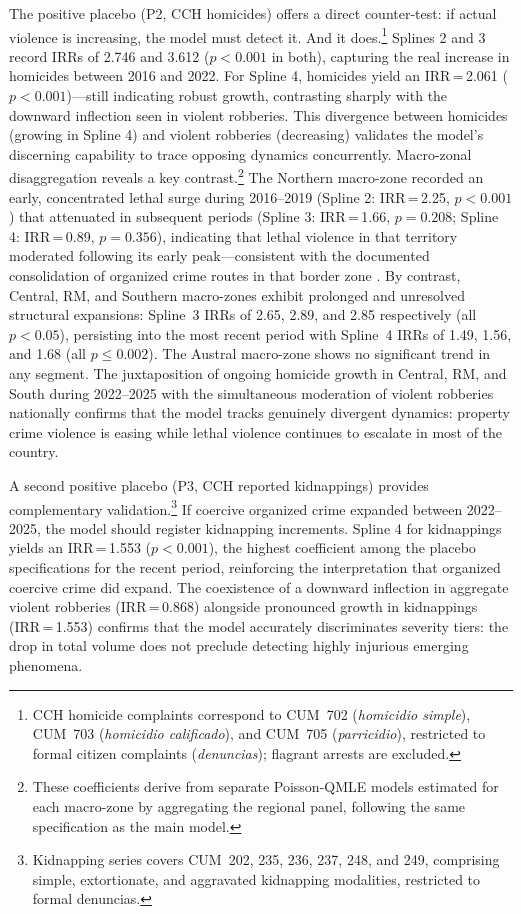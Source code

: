 \documentclass[pdflatex,sn-basic]{sn-jnl}
\begin{document}
The positive placebo (P2, CCH homicides) offers a direct counter-test: if actual violence is increasing, the model must detect it. And it does.\footnote{CCH homicide complaints correspond to CUM~702 (\textit{homicidio simple}), CUM~703 (\textit{homicidio calificado}), and CUM~705 (\textit{parricidio}), restricted to formal citizen complaints (\textit{denuncias}); flagrant arrests are excluded.} Splines 2 and 3 record IRRs of 2.746 and 3.612 ($p<0.001$ in both), capturing the real increase in homicides between 2016 and 2022. For Spline 4, homicides yield an IRR\,=\,2.061 ($p<0.001$)---still indicating robust growth, contrasting sharply with the downward inflection seen in violent robberies. This divergence between homicides (growing in Spline 4) and violent robberies (decreasing) validates the model's discerning capability to trace opposing dynamics concurrently. Macro-zonal disaggregation reveals a key contrast.\footnote{These coefficients derive from separate Poisson-QMLE models estimated for each macro-zone by aggregating the regional panel, following the same specification as the main model.} The Northern macro-zone recorded an early, concentrated lethal surge during 2016--2019 (Spline 2: IRR\,=\,2.25, $p<0.001$) that attenuated in subsequent periods (Spline 3: IRR\,=\,1.66, $p=0.208$; Spline 4: IRR\,=\,0.89, $p=0.356$), indicating that lethal violence in that territory moderated following its early peak---consistent with the documented consolidation of organized crime routes in that border zone \citep{bravo2024}. By contrast, Central, RM, and Southern macro-zones exhibit prolonged and unresolved structural expansions: Spline~3 IRRs of 2.65, 2.89, and 2.85 respectively (all $p<0.05$), persisting into the most recent period with Spline~4 IRRs of 1.49, 1.56, and 1.68 (all $p\leq0.002$). The Austral macro-zone shows no significant trend in any segment. The juxtaposition of ongoing homicide growth in Central, RM, and South during 2022--2025 with the simultaneous moderation of violent robberies nationally confirms that the model tracks genuinely divergent dynamics: property crime violence is easing while lethal violence continues to escalate in most of the country.

A second positive placebo (P3, CCH reported kidnappings) provides complementary validation.\footnote{Kidnapping series covers CUM~202, 235, 236, 237, 248, and 249, comprising simple, extortionate, and aggravated kidnapping modalities, restricted to formal denuncias.} If coercive organized crime expanded between 2022--2025, the model should register kidnapping increments. Spline 4 for kidnappings yields an IRR\,=\,1.553 ($p<0.001$), the highest coefficient among the placebo specifications for the recent period, reinforcing the interpretation that organized coercive crime did expand. The coexistence of a downward inflection in aggregate violent robberies (IRR\,=\,0.868) alongside pronounced growth in kidnappings (IRR\,=\,1.553) confirms that the model accurately discriminates severity tiers: the drop in total volume does not preclude detecting highly injurious emerging phenomena.
\end{document}

